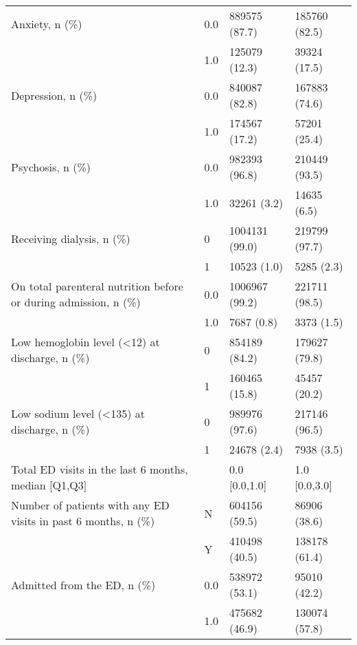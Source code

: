 \begin{tabular}{llll}
Anxiety, n (\%) & 0.0 &                  889575 (87.7) &     185760 (82.5) \\
                                       & 1.0 &                  125079 (12.3) &      39324 (17.5) \\
Depression, n (\%) & 0.0 &                  840087 (82.8) &     167883 (74.6) \\
                                       & 1.0 &                  174567 (17.2) &      57201 (25.4) \\
Psychosis, n (\%) & 0.0 &                  982393 (96.8) &     210449 (93.5) \\
                                       & 1.0 &                    32261 (3.2) &       14635 (6.5) \\
Receiving dialysis, n (\%) & 0 &                 1004131 (99.0) &     219799 (97.7) \\
                                       & 1 &                    10523 (1.0) &        5285 (2.3) \\
On total parenteral nutrition before or during admission, n (\%) & 0.0 &                 1006967 (99.2) &     221711 (98.5) \\
                                       & 1.0 &                     7687 (0.8) &        3373 (1.5) \\
Low hemoglobin level (<12) at discharge, n (\%) & 0 &                  854189 (84.2) &     179627 (79.8) \\
                                       & 1 &                  160465 (15.8) &      45457 (20.2) \\
Low sodium level (<135) at discharge, n (\%) & 0 &                  989976 (97.6) &     217146 (96.5) \\
                                       & 1 &                    24678 (2.4) &        7938 (3.5) \\
Total ED visits in the last 6 months, median [Q1,Q3] &   &                  0.0 [0.0,1.0] &     1.0 [0.0,3.0] \\
Number of patients with any ED visits in past 6 months, n (\%) & N &                  604156 (59.5) &      86906 (38.6) \\
                                       & Y &                  410498 (40.5) &     138178 (61.4) \\
Admitted from the ED, n (\%) & 0.0 &                  538972 (53.1) &      95010 (42.2) \\
                                       & 1.0 &                  475682 (46.9) &     130074 (57.8) \\

\end{tabular}
